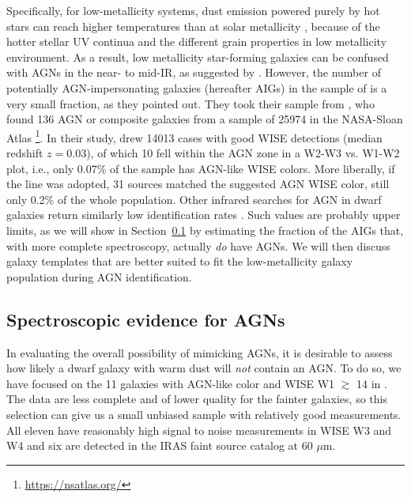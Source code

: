 \documentclass[twocolumn]{aastex63}
\begin{document}
{Specifically, for low-metallicity systems, dust emission powered purely by
hot stars can reach higher temperatures than at solar metallicity
\citep[e.g.,][]{Draine2007}, because of the hotter stellar UV continua and the
different grain properties in low metallicity environment. As a result, low
metallicity star-forming galaxies can be confused with AGNs in the near- to
mid-IR, as suggested by \citet{Hainline2016, Sturm2025}. However, the number
of potentially AGN-impersonating galaxies (hereafter AIGs) in the sample of
\citet{Hainline2016} is a very small fraction, as they pointed out. They took
their sample from \citet{Reines2013}, who found 136 AGN or composite galaxies
from a sample of 25974 in the NASA-Sloan Atlas
\footnote{\url{https://nsatlas.org/}}. In their study, \citet{Hainline2016} drew
14013 cases with good WISE detections  (median redshift $z = 0.03$), of which 10 fell within the
\citet{Jarrett2011} AGN zone in a W2-W3 vs. W1-W2 plot, i.e., only 0.07\% of the sample has 
AGN-like WISE colors. More liberally, if the \citet{Stern2012} line was adopted, 31 sources matched the suggested AGN WISE color, still only
0.2\% of the whole population. Other infrared searches for AGN in dwarf galaxies return similarly low identification rates \citep[e.g.,][]{Sartori2015, Mezcua2024}. Such values are probably upper limits, as we will show in Section~\ref{sec:BPTAGNs}
by estimating the fraction of the AIGs that, with more complete spectroscopy,
actually {\it do} have AGNs. We will then discuss galaxy templates that are better suited to fit 
the low-metallicity galaxy population during AGN identification.


\subsection{Spectroscopic evidence for AGNs}
\label{sec:BPTAGNs}

In evaluating the overall possibility of mimicking AGNs, it is desirable to
assess how likely a dwarf galaxy with warm dust will {\it not}
contain an AGN. To do so, we have focused on the 11 galaxies with AGN-like color and WISE W1
$\gtrsim$ 14 in \citet{Hainline2016}. The data are less complete and of lower
quality for the fainter galaxies, so this selection can give us a small unbiased
sample with relatively good measurements. All eleven have reasonably high
signal to noise measurements in WISE W3 and W4 and six are detected in the IRAS faint source
catalog at 60 $\mu$m. 

}
\end{document}
